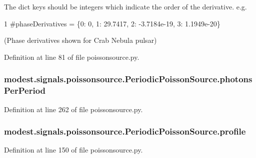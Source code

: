 The dict keys should be integers which indicate the order of the derivative. e.\+g. 
\begin{DoxyCode}
1 \textcolor{comment}{#phaseDerivatives = \{0: 0, 1: 29.7417, 2: -3.7184e-19, 3: 1.1949e-20\}}
\end{DoxyCode}
 (Phase derivatives shown for Crab Nebula pulsar) 

Definition at line 81 of file poissonsource.\+py.

\subsubsection[{\texorpdfstring{photons\+Per\+Period}{photonsPerPeriod}}]{\setlength{\rightskip}{0pt plus 5cm}modest.\+signals.\+poissonsource.\+Periodic\+Poisson\+Source.\+photons\+Per\+Period}\hypertarget{classmodest_1_1signals_1_1poissonsource_1_1PeriodicPoissonSource_aab9b9fda33f78fe5f0e47c62f2b34e51}{}\label{classmodest_1_1signals_1_1poissonsource_1_1PeriodicPoissonSource_aab9b9fda33f78fe5f0e47c62f2b34e51}


Definition at line 262 of file poissonsource.\+py.

\subsubsection[{\texorpdfstring{profile}{profile}}]{\setlength{\rightskip}{0pt plus 5cm}modest.\+signals.\+poissonsource.\+Periodic\+Poisson\+Source.\+profile}\hypertarget{classmodest_1_1signals_1_1poissonsource_1_1PeriodicPoissonSource_af057537ab956e1eb3bbeadd90bbe0aa9}{}\label{classmodest_1_1signals_1_1poissonsource_1_1PeriodicPoissonSource_af057537ab956e1eb3bbeadd90bbe0aa9}


Definition at line 150 of file poissonsource.\+py.

